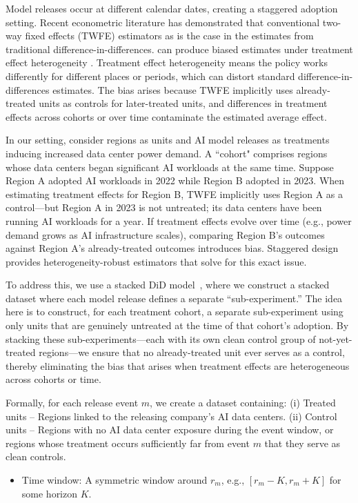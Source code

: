 \documentclass[a4paper,fleqn,longmktitle]{cas-sc}
\newcommand{\nb}[1]{\textcolor{blue}{NB[#1]}}
\begin{document}
Model releases occur at different calendar dates, creating a staggered adoption setting. Recent econometric literature has demonstrated that conventional two-way fixed effects (TWFE) estimators as is the case in the estimates from traditional difference-in-differences. 
can produce biased estimates under treatment effect heterogeneity 
\cite{goodman2021difference, sun2021treatment, callaway2021difference, borusyak2024revisiting}. Treatment effect heterogeneity means the policy works differently for different places or periods, which can distort standard difference-in-differences estimates. The bias arises because TWFE implicitly uses already-treated units as controls for later-treated units, and differences in treatment effects across cohorts or over time contaminate the estimated average effect. 

In our setting, consider regions as units and AI model releases as treatments inducing increased data center power demand. A ``cohort" comprises regions whose data centers began significant AI workloads at the same time. Suppose Region A adopted AI workloads in 2022 while Region B adopted in 2023. When estimating treatment effects for Region B, TWFE implicitly uses Region A as a control—but Region A in 2023 is not untreated; its data centers have been running AI workloads for a year. If treatment effects evolve over time (e.g., power demand grows as AI infrastructure scales), comparing Region B's outcomes against Region A's already-treated outcomes introduces bias. Staggered design provides heterogeneity-robust estimators that solve for this exact issue.


To address this, we use a stacked DiD model~\cite{cengiz2019effect, deshpande2019screened}, where we construct a stacked dataset where each model release defines a separate ``sub-experiment.'' The idea here is to construct, for each treatment cohort, a separate sub-experiment using only units that are genuinely untreated at the time of that cohort's adoption. By stacking these sub-experiments—each with its own clean control group of not-yet-treated regions—we ensure that no already-treated unit ever serves as a control, thereby eliminating the bias that arises when treatment effects are heterogeneous across cohorts or time.

Formally, for each release event $m$, we create a dataset containing: (i) Treated units -- Regions linked to the releasing company's AI data centers. (ii) Control units -- Regions with no AI data center exposure during the event window, or regions whose treatment occurs sufficiently far from event $m$ that they serve as clean controls.
\begin{itemize}
    \item Time window: A symmetric window around $r_m$, e.g., $[r_m - K, r_m + K]$ for some horizon $K$.
\end{itemize}
\end{document}
